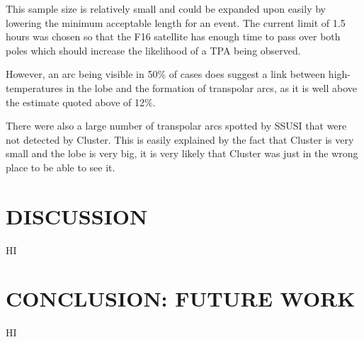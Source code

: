\documentclass[12pt]{article}
\begin{document}
This sample size is relatively small and could be expanded upon easily by lowering the minimum acceptable length for an event. The current limit of 1.5 hours was chosen so that the F16 satellite has enough time to pass over both poles which should increase the likelihood of a TPA being observed.

However, an arc being visible in 50\% of cases does suggest a link between high-temperatures in the lobe and the formation of transpolar arcs, as it is well above the estimate quoted above of 12\%. 

There were also a large number of transpolar arcs spotted by SSUSI that were not detected by Cluster. This is easily explained by the fact that Cluster is very small and the lobe is very big, it is very likely that Cluster was just in the wrong place to be able to see it.
\section{DISCUSSION}
HI

\section{CONCLUSION: FUTURE WORK}
HI \\

\printbibliography
\end{document}
